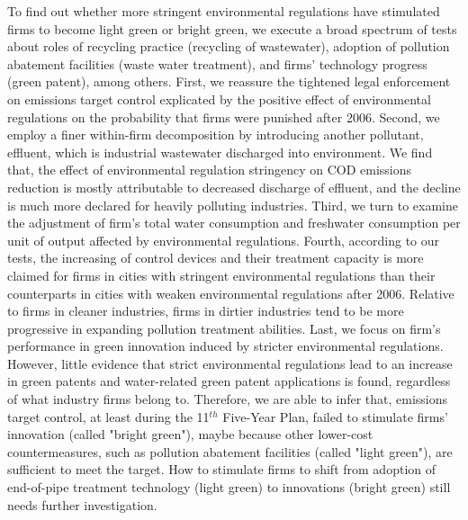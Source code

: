 \documentclass[12pt,english]{article}
\begin{document}
To find out whether more stringent environmental regulations have stimulated firms to become light green or bright green, we execute a broad spectrum of tests about roles of recycling practice (recycling of wastewater), adoption of pollution abatement facilities (waste water treatment), and firms’ technology progress (green patent), among others. First, we reassure the tightened legal enforcement on emissions target control explicated by the positive effect of environmental regulations on the probability that firms were punished after 2006. Second, we employ a finer within-firm decomposition by introducing another pollutant, effluent, which is industrial wastewater discharged into environment. We find that, the effect of environmental regulation stringency on COD emissions reduction is mostly attributable to decreased discharge of effluent, and the decline is much more declared for heavily polluting industries. Third, we turn to examine the adjustment of firm’s total water consumption and freshwater consumption per unit of output affected by environmental regulations. Fourth, according to our tests, the increasing of control devices and their treatment capacity is more claimed for firms in cities with stringent environmental regulations than their counterparts in cities with weaken environmental regulations after 2006. Relative to firms in cleaner industries, firms in dirtier industries tend to be more progressive in expanding pollution treatment abilities. Last, we focus on firm’s performance in green innovation induced by stricter environmental regulations. However, little evidence that strict environmental regulations lead to an increase in green patents and water-related green patent applications is found, regardless of what industry firms belong to. Therefore, we are able to infer that, emissions target control, at least during the 11$^{th}$ Five-Year Plan, failed to stimulate firms' innovation (called "bright green"), maybe because other lower-cost countermeasures, such as pollution abatement facilities (called "light green"), are sufficient to meet the target. How to stimulate firms to shift from adoption of end-of-pipe treatment technology (light green) to innovations (bright green) still needs further investigation.
\end{document}
